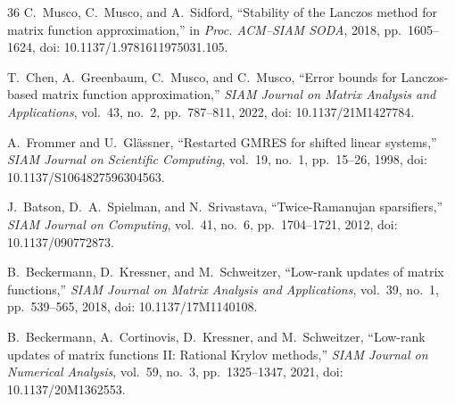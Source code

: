 \documentclass[conference]{IEEEtran}
\theoremstyle{definition}
\begin{document}
\begin{thebibliography}{36}
C.~Musco, C.~Musco, and A.~Sidford,
``Stability of the Lanczos method for matrix function approximation,''
in \emph{Proc. ACM--SIAM SODA}, 2018, pp.~1605--1624,
doi: 10.1137/1.9781611975031.105.

T.~Chen, A.~Greenbaum, C.~Musco, and C.~Musco,
``Error bounds for Lanczos-based matrix function approximation,''
\emph{SIAM Journal on Matrix Analysis and Applications}, vol.~43, no.~2,
pp.~787--811, 2022, doi: 10.1137/21M1427784.

A.~Frommer and U.~Gl\"assner,
``Restarted GMRES for shifted linear systems,''
\emph{SIAM Journal on Scientific Computing}, vol.~19, no.~1,
pp.~15--26, 1998, doi: 10.1137/S1064827596304563.

J.~Batson, D.~A.~Spielman, and N.~Srivastava,
``Twice-Ramanujan sparsifiers,''
\emph{SIAM Journal on Computing}, vol.~41, no.~6,
pp.~1704--1721, 2012, doi: 10.1137/090772873.

B.~Beckermann, D.~Kressner, and M.~Schweitzer,
``Low-rank updates of matrix functions,''
\emph{SIAM Journal on Matrix Analysis and Applications},
vol.~39, no.~1, pp.~539--565, 2018, doi: 10.1137/17M1140108.

B.~Beckermann, A.~Cortinovis, D.~Kressner, and M.~Schweitzer,
``Low-rank updates of matrix functions II: Rational Krylov methods,''
\emph{SIAM Journal on Numerical Analysis},
vol.~59, no.~3, pp.~1325--1347, 2021, doi: 10.1137/20M1362553.

\end{thebibliography}
\end{document}
